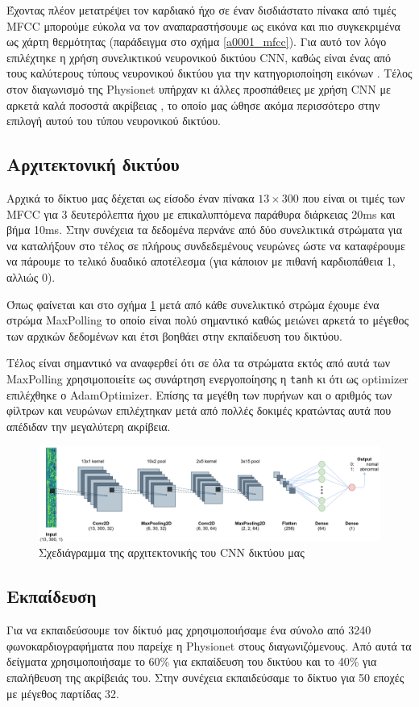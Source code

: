 \documentclass[../main.tex]{subfiles}
\begin{document}
Έχοντας πλέον μετατρέψει τον καρδιακό ήχο σε έναν δισδιάστατο πίνακα από τιμές
MFCC μπορούμε εύκολα να τον αναπαραστήσουμε ως εικόνα και πιο συγκεκριμένα ως
χάρτη θερμότητας (παράδειγμα στο σχήμα \ref{a0001_mfcc}). Για αυτό τον λόγο
επιλέχτηκε η χρήση συνελικτικού νευρονικού δικτύου CNN, καθώς είναι ένας από
τους καλύτερους τύπους νευρονικού δικτύου για την κατηγοριοποίηση εικόνων
\cite{ramprasath2018image}. Τέλος στον διαγωνισμό της Physionet \cite{physionet}
υπήρχαν κι άλλες προσπάθειες με χρήση CNN με αρκετά καλά ποσοστά ακρίβειας
\cite{jrubin}, το οποίο μας ώθησε ακόμα περισσότερο στην επιλογή αυτού του τύπου
νευρονικού δικτύου.

\subsection{Αρχιτεκτονική δικτύου}

Αρχικά το δίκτυο μας δέχεται ως είσοδο έναν πίνακα $13\times300$ που είναι οι
τιμές των MFCC για 3 δευτερόλεπτα ήχου με επικαλυπτόμενα παράθυρα διάρκειας 20ms
και βήμα 10ms. Στην συνέχεια τα δεδομένα περνάνε από δύο συνελικτικά στρώματα
για να καταλήξουν στο τέλος σε πλήρους συνδεδεμένους νευρώνες ώστε να
καταφέρουμε να πάρουμε το τελικό δυαδικό αποτέλεσμα (για κάποιον με πιθανή
καρδιοπάθεια 1, αλλιώς 0).

Όπως φαίνεται και στο σχήμα \ref{cnn} μετά από κάθε συνελικτικό στρώμα έχουμε
ένα στρώμα MaxPolling το οποίο είναι πολύ σημαντικό καθώς μειώνει αρκετά το
μέγεθος των αρχικών δεδομένων και έτσι βοηθάει στην εκπαίδευση του δικτύου.

Τέλος είναι σημαντικό να αναφερθεί ότι σε όλα τα στρώματα εκτός από αυτά των
MaxPolling χρησιμοποιείτε ως συνάρτηση ενεργοποίησης η \verb|tanh| κι ότι ως
optimizer επιλέχθηκε ο AdamOptimizer. Επίσης τα μεγέθη των πυρήνων και ο αριθμός
των φίλτρων και νευρώνων επιλέχτηκαν μετά από πολλές δοκιμές κρατώντας αυτά που
απέδιδαν την μεγαλύτερη ακρίβεια.

\begin{figure}[H]
	\includegraphics[width=\textwidth]{../images/cnn.png}
	\caption{Σχεδιάγραμμα της αρχιτεκτονικής του CNN δικτύου μας}
	\label{cnn}
\end{figure}


\subsection{Εκπαίδευση}

Για να εκπαιδεύσουμε τον δίκτυό μας χρησιμοποιήσαμε ένα σύνολο από 3240
φωνοκαρδιογραφήματα που παρείχε η Physionet \cite{physionet} στους
διαγωνιζόμενους. Από αυτά τα δείγματα χρησιμοποιήσαμε το 60\% για εκπαίδευση του
δικτύου και το 40\% για επαλήθευση της ακρίβειάς του. Στην συνέχεια εκπαιδεύσαμε
το δίκτυο για 50 εποχές με μέγεθος παρτίδας 32.
\end{document}
